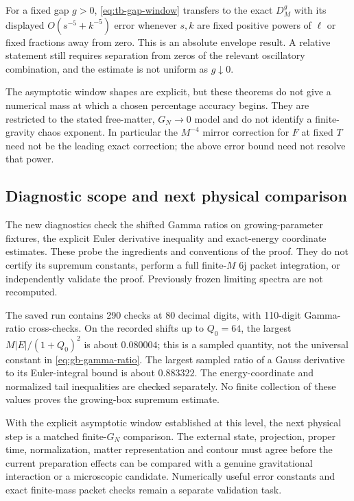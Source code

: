 For a fixed gap $g>0$, \eqref{eq:tb-gap-window} transfers to the exact
$D_M^g$ with its displayed $O(s^{-5}+k^{-5})$ error whenever $s,k$
are fixed positive powers of $\ell$ or fixed fractions away from zero.
This is an absolute envelope result. A relative statement still requires
separation from zeros of the relevant oscillatory combination, and the
estimate is not uniform as $g\downarrow0$.

The asymptotic window shapes are explicit, but these theorems do not
give a numerical mass at which a chosen percentage accuracy begins.
They are restricted to the stated free-matter, $G_N\to0$ model and do
not identify a finite-gravity chaos exponent. In particular the
$M^{-4}$ mirror correction for $F$ at fixed $T$ need not be the leading
exact correction; the above error bound need not resolve that power.

\subsection{Diagnostic scope and next physical comparison}
The new diagnostics check the shifted Gamma ratios on growing-parameter
fixtures, the explicit Euler derivative inequality and exact-energy
coordinate estimates. These probe the ingredients and conventions of
the proof. They do not certify its supremum constants, perform a full
finite-$M$ 6j packet integration, or independently validate the proof.
Previously frozen limiting spectra are not recomputed.

The saved run contains 290 checks at 80 decimal digits, with 110-digit
Gamma-ratio cross-checks. On the recorded shifts up to $Q_0=64$, the
largest $M|E|/(1+Q_0)^2$ is about $0.080004$; this is a sampled
quantity, not the universal constant in \eqref{eq:gb-gamma-ratio}.
The largest sampled ratio of a Gauss derivative to its Euler-integral
bound is about $0.883322$. The energy-coordinate and normalized tail
inequalities are checked separately. No finite collection of these
values proves the growing-box supremum estimate.

With the explicit asymptotic window established at this level, the next
physical step is a matched finite-$G_N$ comparison. The external state,
projection, proper time, normalization, matter representation and contour
must agree before the current preparation effects can be compared with
a genuine gravitational interaction or a microscopic candidate.
Numerically useful error constants and exact finite-mass packet checks
remain a separate validation task.
